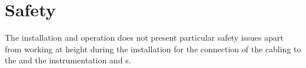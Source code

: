 




\section{Safety}
\label{sec:fddp-crp-safety}

The  installation and operation does not present particular safety issues apart from working at height during the  installation for the connection of the cabling to the  and the instrumentation and  \fdth{}s.


















